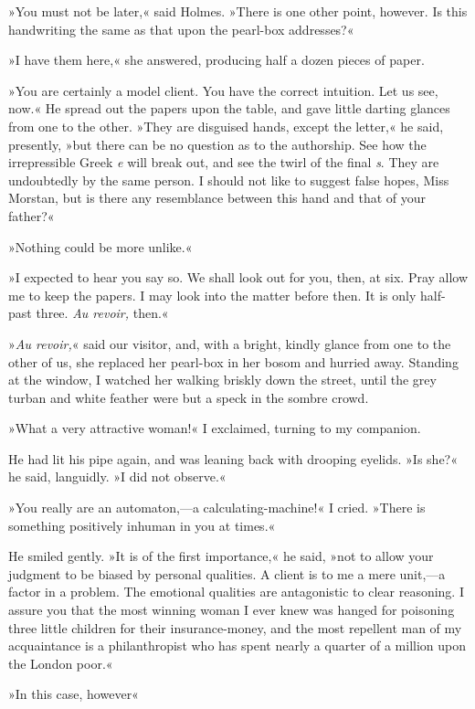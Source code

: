 »You must not be later,« said Holmes. »There is one other point, however. Is this handwriting the same as that upon the pearl-box addresses?«

»I have them here,« she answered, producing half a dozen pieces of paper.

»You are certainly a model client. You have the correct intuition. Let us see, now.« He spread out the papers upon the table, and gave little darting glances from one to the other. »They are disguised hands, except the letter,« he said, presently, »but there can be no question as to the authorship. See how the irrepressible Greek \textit{e} will break out, and see the twirl of the final \textit{s}. They are undoubtedly by the same person. I should not like to suggest false hopes, Miss Morstan, but is there any resemblance between this hand and that of your father?«

»Nothing could be more unlike.«

»I expected to hear you say so. We shall look out for you, then, at six. Pray allow me to keep the papers. I may look into the matter before then. It is only half-past three. \textit{Au revoir,} then.«

»\textit{Au revoir,}« said our visitor, and, with a bright, kindly glance from one to the other of us, she replaced her pearl-box in her bosom and hurried away. Standing at the window, I watched her walking briskly down the street, until the grey turban and white feather were but a speck in the sombre crowd.

»What a very attractive woman!« I exclaimed, turning to my companion.

He had lit his pipe again, and was leaning back with drooping eyelids. »Is she?« he said, languidly. »I did not observe.«

»You really are an automaton,—a calculating-machine!« I cried. »There is something positively inhuman in you at times.«

He smiled gently. »It is of the first importance,« he said, »not to allow your judgment to be biased by personal qualities. A client is to me a mere unit,—a factor in a problem. The emotional qualities are antagonistic to clear reasoning. I assure you that the most winning woman I ever knew was hanged for poisoning three little children for their insurance-money, and the most repellent man of my acquaintance is a philanthropist who has spent nearly a quarter of a million upon the London poor.«

»In this case, however\longdash«

